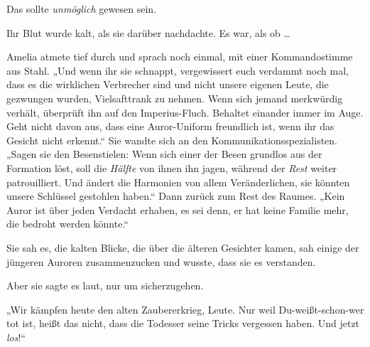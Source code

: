 Das sollte \emph{unmöglich} gewesen sein.

Ihr Blut wurde kalt, als sie darüber nachdachte. Es war, als ob …

Amelia atmete tief durch und sprach noch einmal, mit einer Kommandostimme aus Stahl.
„Und wenn ihr sie schnappt, vergewissert euch verdammt noch mal, dass es die wirklichen Verbrecher sind und nicht unsere eigenen Leute, die gezwungen wurden, Vielsafttrank zu nehmen. Wenn sich jemand merkwürdig verhält, überprüft ihn auf den Imperius-Fluch. Behaltet einander immer im Auge. Geht nicht davon aus, dass eine Auror-Uniform freundlich ist, wenn ihr das Gesicht nicht erkennt.“ Sie wandte sich an den Kommunikationsspezialisten.
„Sagen sie den Besenstielen: Wenn sich einer der Besen grundlos aus der Formation löst, soll die \emph{Hälfte} von ihnen ihn jagen, während der \emph{Rest} weiter patrouilliert. Und ändert die Harmonien von allem Veränderlichen, sie könnten unsere Schlüssel gestohlen haben.“ Dann zurück zum Rest des Raumes.
„Kein Auror ist über jeden Verdacht erhaben, es sei denn, er hat keine Familie mehr, die bedroht werden könnte.“

Sie sah es, die kalten Blicke, die über die älteren Gesichter kamen, sah einige der jüngeren Auroren zusammenzucken und wusste, dass sie es verstanden.

Aber sie sagte es laut, nur um sicherzugehen.

„Wir kämpfen heute den alten Zaubererkrieg, Leute. Nur weil Du-weißt-schon-wer tot ist, heißt das nicht, dass die Todesser seine Tricks vergessen haben. Und jetzt \emph{los}!“

